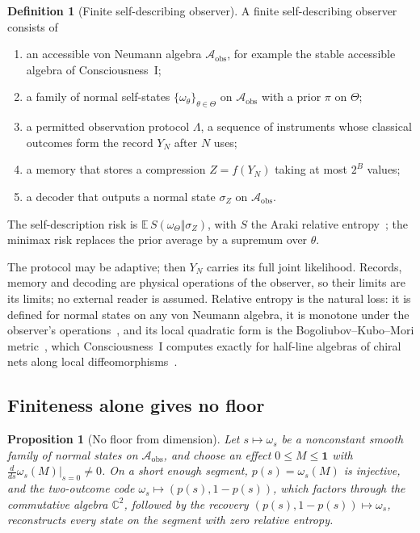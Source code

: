 \documentclass[12pt]{article}
\newtheorem{proposition}[theorem]{Proposition}
\theoremstyle{definition}
\newtheorem{definition}[theorem]{Definition}
\theoremstyle{remark}
\newcommand{\E}{\mathbb E}
\begin{document}
\begin{definition}[Finite self-describing observer]\label{def:observer}
A finite self-describing observer consists of
\begin{enumerate}[itemsep=1pt]
\item an accessible von Neumann algebra $\mathcal A_{\mathrm{obs}}$, for example the stable accessible algebra of Consciousness~I;
\item a family of normal self-states $\{\omega_\theta\}_{\theta\in\Theta}$ on $\mathcal A_{\mathrm{obs}}$ with a prior $\pi$ on $\Theta$;
\item a permitted observation protocol $\Lambda$, a sequence of instruments whose classical outcomes form the record $Y_N$ after $N$ uses;
\item a memory that stores a compression $Z=f(Y_N)$ taking at most $2^B$ values;
\item a decoder that outputs a normal state $\sigma_Z$ on $\mathcal A_{\mathrm{obs}}$.
\end{enumerate}
The self-description risk is $\E\,S(\omega_\Theta\Vert\sigma_Z)$, with $S$ the Araki relative entropy~\cite{Araki1976}; the minimax risk replaces the prior average by a supremum over $\theta$.
\end{definition}

The protocol may be adaptive; then $Y_N$ carries its full joint likelihood. Records, memory and decoding are physical operations of the observer, so their limits are its limits; no external reader is assumed. Relative entropy is the natural loss: it is defined for normal states on any von Neumann algebra, it is monotone under the observer's operations~\cite{Petz1986}, and its local quadratic form is the Bogoliubov--Kubo--Mori metric~\cite{Petz1996}, which Consciousness~I computes exactly for half-line algebras of chiral nets along local diffeomorphisms~\cite{PaperI}.

\subsection{Finiteness alone gives no floor}

\begin{proposition}[No floor from dimension]\label{prop:noFloor}
Let $s\mapsto\omega_s$ be a nonconstant smooth family of normal states on $\mathcal A_{\mathrm{obs}}$, and choose an effect $0\le M\le\mathbf 1$ with $\frac{d}{ds}\omega_s(M)|_{s=0}\neq0$. On a short enough segment, $p(s)=\omega_s(M)$ is injective, and the two-outcome code $\omega_s\mapsto(p(s),1-p(s))$, which factors through the commutative algebra $\mathbb C^2$, followed by the recovery $(p(s),1-p(s))\mapsto\omega_s$, reconstructs every state on the segment with zero relative entropy.
\end{proposition}
\end{document}
